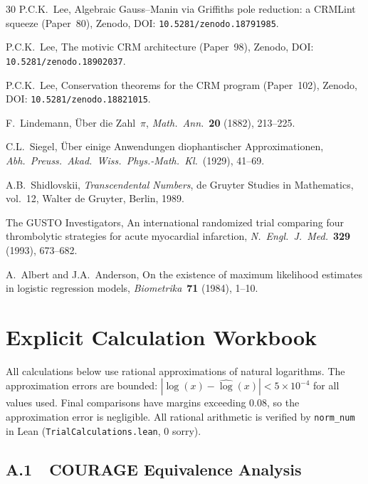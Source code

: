 \documentclass[11pt,a4paper]{article}
\theoremstyle{plain}
\theoremstyle{definition}
\begin{document}
\begin{thebibliography}{30}
P.C.K.~Lee, Algebraic Gauss--Manin via Griffiths pole reduction: a CRMLint squeeze (Paper~80), Zenodo, DOI: \texttt{10.5281/zenodo.18791985}.

P.C.K.~Lee, The motivic CRM architecture (Paper~98), Zenodo, DOI: \texttt{10.5281/zenodo.18902037}.

P.C.K.~Lee, Conservation theorems for the CRM program (Paper~102), Zenodo, DOI: \texttt{10.5281/zenodo.18821015}.

F.~Lindemann, \"Uber die Zahl~$\pi$, \emph{Math.\ Ann.}\ \textbf{20} (1882), 213--225.

C.L.~Siegel, \"Uber einige Anwendungen diophantischer Approximationen, \emph{Abh.\ Preuss.\ Akad.\ Wiss.\ Phys.-Math.\ Kl.}\ (1929), 41--69.

A.B.~Shidlovskii, \emph{Transcendental Numbers}, de Gruyter Studies in Mathematics, vol.~12, Walter de Gruyter, Berlin, 1989.

The GUSTO Investigators, An international randomized trial comparing four thrombolytic strategies for acute myocardial infarction, \emph{N.\ Engl.\ J.\ Med.}\ \textbf{329} (1993), 673--682.

A.~Albert and J.A.~Anderson, On the existence of maximum likelihood estimates in logistic regression models, \emph{Biometrika}\ \textbf{71} (1984), 1--10.

\end{thebibliography}

\appendix
\section{Explicit Calculation Workbook}\label{app:calc}

All calculations below use rational approximations of natural logarithms.  The approximation errors are bounded: $|\log(x) - \widehat{\log}(x)| < 5 \times 10^{-4}$ for all values used.  Final comparisons have margins exceeding $0.08$, so the approximation error is negligible.  All rational arithmetic is verified by \texttt{norm\_num} in Lean (\texttt{TrialCalculations.lean}, 0 sorry).

\subsection*{A.1\ \ COURAGE Equivalence Analysis}
\end{document}
